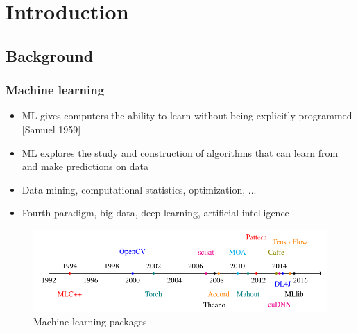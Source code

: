 
\section{Introduction}\label{sec:intro}

\subsection{Background}

\begin{frame}
  \MyLogo
  \frametitle{Machine learning}  

\begin{itemize}

\item ML gives computers the ability to learn without being explicitly programmed [Samuel 1959]

\item ML explores the study and construction of algorithms that can learn from and make predictions on data

\item Data mining, computational statistics, optimization, ...

\item Fourth paradigm, big data, deep learning, artificial intelligence 

\end{itemize}

\begin{figure}[htbp] %
   \centering
   \includegraphics[width=\linewidth]{figures/ML.pdf} 
   \caption{Machine learning packages}
   \label{fig:MLcode}
\end{figure}

\end{frame}



